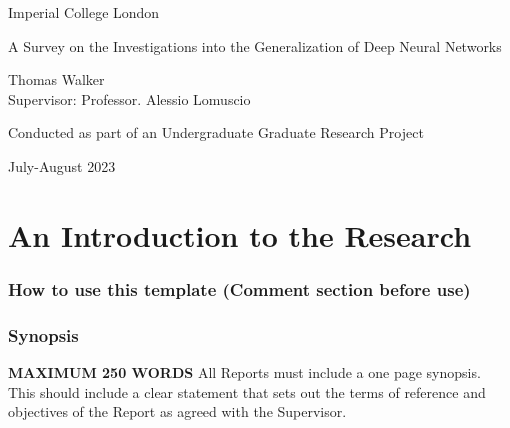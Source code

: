 \documentclass[a4paper,11]{article}
\begin{document}
	\begin{center}
		{\large Imperial College London}
	\end{center}
	\vspace{6cm}
	
	\begin{center}
		
		\Huge A Survey on the Investigations into the Generalization of Deep Neural Networks
		
	\end{center}
	\vspace{2.5cm}
	\begin{center}
		\Large Thomas Walker\\Supervisor: Professor. Alessio Lomuscio
	\end{center}
	
	\vspace{8cm}
	\begin{center}
		{\large Conducted as part of an Undergraduate Graduate Research Project}
	\end{center}
	
	\begin{center}
		{\large July-August 2023}
	\end{center}		

	\newpage

\tableofcontents
\newpage
\part{An Introduction to the Research}
\section{How to use this template (Comment section before use)}
\cite{Elvidge_Baugh_Zhizhin_Hsu_Ghosh_2017}

\pagebreak

\section*{Synopsis}
\textbf{MAXIMUM 250 WORDS}
All Reports must include a one page synopsis. This should include a clear statement that sets out the terms of reference and objectives of the Report as agreed with the Supervisor.
%


\pagebreak
\end{document}

